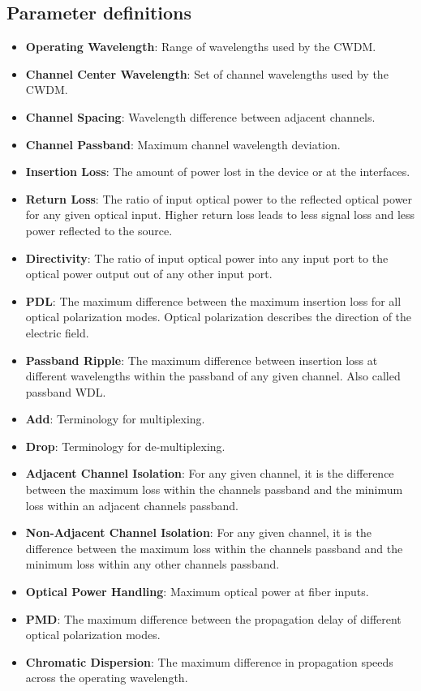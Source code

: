 \subsection{Parameter definitions}

\begin{itemize}
	\item \textbf{Operating Wavelength}: Range of wavelengths used by the CWDM\cite{noauthor_glossary_2015}.
	\item \textbf{Channel Center Wavelength}: Set of channel wavelengths used by the CWDM\cite{noauthor_glossary_2015}.
	\item \textbf{Channel Spacing}: Wavelength difference between adjacent channels\cite{noauthor_definitions_nodate}.
	\item \textbf{Channel Passband}: Maximum channel wavelength deviation\cite{noauthor_glossary_2015}.
	\item \textbf{Insertion Loss}: The amount of power lost in the device or at the interfaces\cite{noauthor_glossary_2015}.
	\item \textbf{Return Loss}: The ratio of input optical power to the reflected optical power for any given optical input. Higher return loss leads to less signal loss and less power reflected to the source\cite{noauthor_glossary_2015}.
	\item \textbf{Directivity}: The ratio of input optical power into any input port to the optical power output out of any other input port\cite{noauthor_definitions_nodate}.
	\item \textbf{PDL}: The maximum difference between the maximum insertion loss for all optical polarization modes\cite{noauthor_glossary_2015}. Optical polarization describes the direction of the electric field\cite{noauthor_introduction_nodate}.
	\item \textbf{Passband Ripple}: The maximum difference between insertion loss at different wavelengths within the passband of any given channel. Also called passband WDL.
	\item \textbf{Add}: Terminology for multiplexing\cite{noauthor_glossary_2015}.
	\item \textbf{Drop}: Terminology for de-multiplexing\cite{noauthor_glossary_2015}.
	\item \textbf{Adjacent Channel Isolation}: For any given channel, it is the difference between the maximum loss within the channels passband and the minimum loss within an adjacent channels passband\cite{noauthor_glossary_2015}.
	\item \textbf{Non-Adjacent Channel Isolation}: For any given channel, it is the difference between the maximum loss within the channels passband and the minimum loss within any other channels passband\cite{noauthor_glossary_2015}.
	\item \textbf{Optical Power Handling}: Maximum optical power at fiber inputs.
	\item \textbf{PMD}: The maximum difference between the propagation delay of different optical polarization modes\cite{consulting_polarization_nodate}.
	\item \textbf{Chromatic Dispersion}: The maximum difference in propagation speeds across the operating wavelength\cite{paschotta_chromatic_nodate}.
\end{itemize}